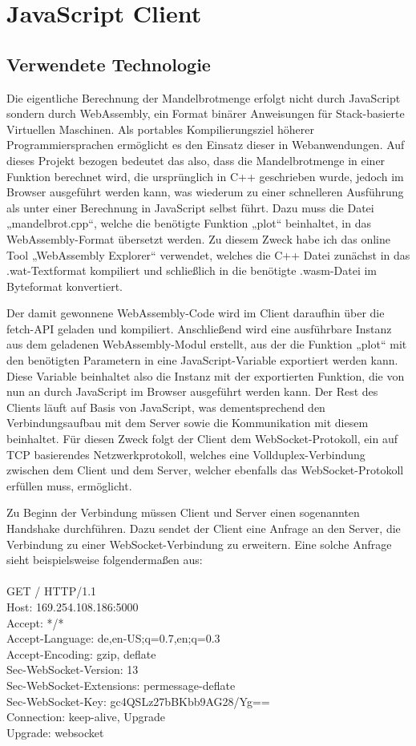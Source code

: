 \documentclass[12pt, onecolumn,notitlepage]{scrartcl}
\begin{document}
\section{JavaScript Client}
\subsection{Verwendete Technologie}
Die eigentliche Berechnung der Mandelbrotmenge erfolgt nicht durch JavaScript sondern durch WebAssembly, ein Format binärer Anweisungen für Stack-basierte Virtuellen Maschinen. Als portables Kompilierungsziel höherer Programmiersprachen ermöglicht es den Einsatz dieser in Webanwendungen.  Auf dieses Projekt bezogen bedeutet das also, dass die Mandelbrotmenge in einer Funktion berechnet wird, die ursprünglich in C++ geschrieben wurde, jedoch im Browser ausgeführt werden kann, was wiederum zu einer schnelleren Ausführung als unter einer Berechnung in JavaScript selbst führt. Dazu muss die Datei „mandelbrot.cpp“, welche die benötigte Funktion „plot“ beinhaltet, in das WebAssembly-Format übersetzt werden. Zu diesem Zweck habe ich das online Tool „WebAssembly Explorer“   verwendet, welches die C++ Datei zunächst in das .wat-Textformat kompiliert und schließlich in die benötigte .wasm-Datei im Byteformat konvertiert. \par
Der damit gewonnene WebAssembly-Code wird im Client daraufhin über die fetch-API geladen und kompiliert. Anschließend wird eine ausführbare Instanz aus dem geladenen WebAssembly-Modul erstellt, aus der die Funktion „plot“ mit den benötigten Parametern in eine JavaScript-Variable exportiert werden kann. Diese Variable beinhaltet also die Instanz mit der exportierten Funktion, die von nun an durch JavaScript im Browser ausgeführt werden kann.
Der Rest des Clients läuft auf Basis von JavaScript, was dementsprechend den Verbindungsaufbau mit dem Server sowie die Kommunikation mit diesem beinhaltet. Für diesen Zweck folgt der Client dem WebSocket-Protokoll, ein auf TCP basierendes Netzwerkprotokoll, welches eine Vollduplex-Verbindung zwischen dem Client und dem Server, welcher ebenfalls das WebSocket-Protokoll erfüllen muss, ermöglicht. \par
Zu Beginn der Verbindung müssen Client und Server einen sogenannten Handshake durchführen. Dazu sendet der Client eine Anfrage an den Server, die Verbindung zu einer WebSocket-Verbindung zu erweitern. Eine solche Anfrage sieht beispielsweise folgendermaßen aus: \\ \\
GET / HTTP/1.1 \\
Host: 169.254.108.186:5000 \\
Accept: */* \\
Accept-Language: de,en-US;q=0.7,en;q=0.3 \\
Accept-Encoding: gzip, deflate \\
Sec-WebSocket-Version: 13 \\
Sec-WebSocket-Extensions: permessage-deflate \\
Sec-WebSocket-Key: gc4QSLz27bBKbb9AG28/Yg== \\
Connection: keep-alive, Upgrade \\
Upgrade: websocket \\
\end{document}
